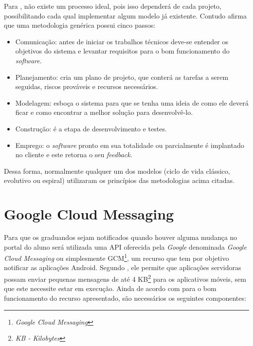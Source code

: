 	\par Para , não existe um processo ideal, pois isso
dependerá de cada projeto, possibilitando cada qual implementar algum modelo já
existente. Contudo  afirma que uma metodologia
genérica possui cinco passos:
	\begin{itemize}
	  
	  \item Comunicação: antes de iniciar os trabalhos técnicos deve-se entender
	  os objetivos do sistema e levantar requisitos para o bom funcionamento do
	  \textit{software}.
	  
	  \item Planejamento: cria um plano de projeto, que conterá as tarefas a
	  serem seguidas, riscos prováveis e recursos necessários.
	  
	  \item Modelagem: esboça o sistema para que se tenha uma ideia de como ele
	  deverá ficar e como encontrar a melhor solução para desenvolvê-lo.
	  
	  \item Construção: é a etapa de desenvolvimento e testes.
	  
	  \item Emprego: o \textit{software} pronto em sua totalidade ou parcialmente
	  é implantado no cliente e este retorna o seu \textit{feedback}.
	 
	 \end{itemize}
	 
	 \par Dessa forma, normalmente qualquer um dos modelos (ciclo de vida clássico,
evolutivo ou espiral) utilizaram os princípios das metodologias acima citadas.
	
\section{\textbf{Google Cloud 	Messaging}}

	\par Para que os graduandos sejam notificados quando houver alguma mudança no
portal do aluno será utilizada uma API oferecida pela \textit{Google}
denominada \textit{Google Cloud Messaging} ou simplesmente
GCM\footnote{\textit{Google Cloud Messaging}}, um recurso que tem por objetivo
notificar as aplicações Android. Segundo , ele permite que
aplicações servidoras possam enviar pequenas mensagens de até 4
KB\footnote{\textit{KB - Kilobytes}} para os aplicativos móveis, sem que este
necessite estar em execução. Ainda de acordo com  para o
bom funcionamento do recurso apresentado, são necessários os seguintes componentes:

